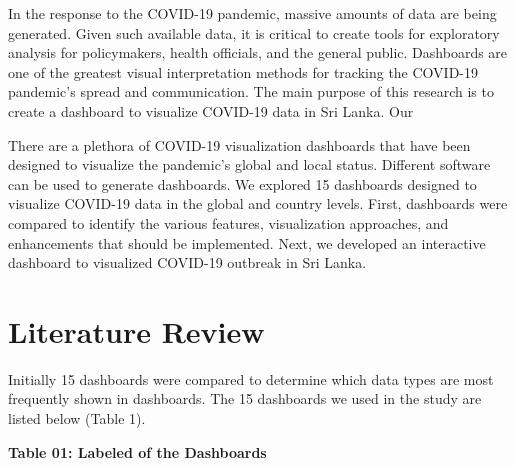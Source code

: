 \documentclass[
]{article}
\begin{document}
In the response to the COVID-19 pandemic, massive amounts of data are
being generated. Given such available data, it is critical to create
tools for exploratory analysis for policymakers, health officials, and
the general public. Dashboards are one of the greatest visual
interpretation methods for tracking the COVID-19 pandemic's spread and
communication. The main purpose of this research is to create a
dashboard to visualize COVID-19 data in Sri Lanka. Our

There are a plethora of COVID-19 visualization dashboards that have been
designed to visualize the pandemic's global and local status. Different
software can be used to generate dashboards. We explored 15 dashboards
designed to visualize COVID-19 data in the global and country levels.
First, dashboards were compared to identify the various features,
visualization approaches, and enhancements that should be implemented.
Next, we developed an interactive dashboard to visualized COVID-19
outbreak in Sri Lanka.

\hypertarget{literature-review}{%
\section{Literature Review}\label{literature-review}}

Initially 15 dashboards were compared to determine which data types are
most frequently shown in dashboards. The 15 dashboards we used in the
study are listed below (Table 1).

\textbf{Table 01: Labeled of the Dashboards}
\end{document}
